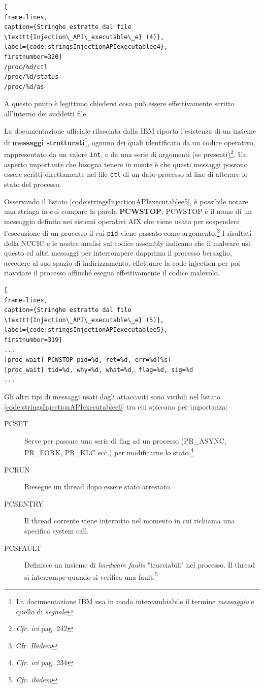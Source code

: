 \documentclass[10pt,a4paper, titlepage]{report}
\begin{document}
\begin{lstlisting}[
frame=lines, 
caption={Stringhe estratte dal file \texttt{Injection\_API\_executable\_e} (4)}, 
label={code:stringsInjectionAPIexecutablee4},
firstnumber=320]
/proc/%d/ctl
/proc/%d/status
/proc/%d/as
\end{lstlisting}

A questo punto è legittimo chiedersi cosa può essere effettivamente scritto all'interno dei suddetti file.

La documentazione ufficiale rilasciata dalla IBM riporta l'esistenza di un insieme di \textbf{messaggi strutturati}\footnote{La documentazione IBM usa in modo intercambiabile il termine \textit{messaggio} e quello di \textit{segnale}}, ognuno dei quali identificato da un codice operativo, rappresentato da un valore \texttt{int}, e da una serie di argomenti (se presenti)\footnote{\textit{Cfr. ivi} pag. 242}. Un aspetto importante che bisogna tenere in mente è che questi messaggi possono essere scritti direttamente nel file \texttt{ctl} di un dato processo al fine di alterare lo stato del processo.

Osservando il listato \ref{code:stringsInjectionAPIexecutablee5}, è possibile notare una stringa in cui compare la parola \textbf{PCWSTOP}; PCWSTOP è il nome di un messaggio definito nei sistemi operativi AIX che viene usato per sospendere l'esecuzione di un processo il cui \texttt{pid} viene passato come argomento.\footnote{Cfr. \textit{Ibidem}}
I risultati della NCCIC e le nostre analisi sul codice assembly indicano che il malware usi questo ed altri messaggi per interrompere dapprima il processo bersaglio, accedere al suo spazio di indirizzamento, effettuare la code injection per poi riavviare il processo affinché esegua effettivamente il codice malevolo.

\begin{lstlisting}[
frame=lines, 
caption={Stringhe estratte dal file \texttt{Injection\_API\_executable\_e} (5)}, 
label={code:stringsInjectionAPIexecutablee5},
firstnumber=319]
...
[proc_wait] PCWSTOP pid=%d, ret=%d, err=%d(%s)
[proc_wait] tid=%d, why=%d, what=%d, flag=%d, sig=%d
...
\end{lstlisting}

Gli altri tipi di messaggi usati dagli attaccanti sono visibili nel listato \ref{code:stringsInjectionAPIexecutablee6} tra cui spiccano per importanza:

\begin{description}
\item[PCSET] Serve per passare una serie di flag ad un processo (PR\_ASYNC, PR\_FORK, PR\_KLC ecc.) per modificarne lo stato.\footnote{\textit{Cfr. ivi} pag. 234} 
\item[PCRUN] Riesegue un thread dopo essere stato arrestato.
\item[PCSENTRY] Il thread corrente viene interrotto nel momento in cui richiama una specifica system call. 
\item[PCSFAULT] Definisce un insieme di \textit{hardware faults} "tracciabili" nel processo. Il thread si interrompe quando si verifica una fault.\footnote{\textit{Cfr. ibidem}} 
\end{description}
\end{document}

